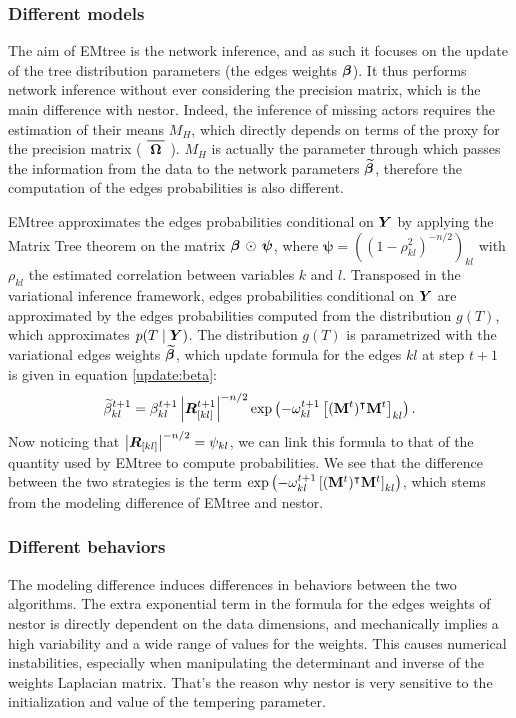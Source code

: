 \begin{subappendices}
\subsubsection*{Different models}

The aim of EMtree is the network inference, and as such it focuses on the update of the tree distribution parameters (the edges weights ${\boldsymbol{\beta}}$). It thus performs network inference without ever considering the precision matrix, which is the main difference with nestor.  Indeed, the inference of missing actors requires the estimation of their means $M_H$, which directly depends on terms of the proxy for the precision matrix ($\xbar{\Omegabf}$). $M_H$ is actually the parameter through which passes the information from the data to the network parameters ${\widetilde{{\boldsymbol{\beta}}}}$, therefore the computation of the edges probabilities is also different. 

EMtree approximates the edges probabilities conditional on  ${\boldsymbol{Y}}$ by applying the Matrix Tree theorem on the matrix ${\boldsymbol{\beta}} \,\odot \,\boldsymbol{\psi}$, where $\boldsymbol{\psi}=\left((1-\rho_{kl}^2)^{-n/2}\right)_{kl}$ with $\rho_{kl}$ the estimated correlation between variables $k$ and $l$. Transposed in the variational inference framework, edges probabilities conditional on ${\boldsymbol{Y}}$ are approximated by the edges probabilities computed from the distribution $g(T)$, which approximates $p(T\mid{\boldsymbol{Y}})$. The distribution $g(T)$ is parametrized with the  variational edges weights ${\widetilde{{\boldsymbol{\beta}}}}$, which update formula for the edges $kl$ at step $t+1$ is given in equation \eqref{update:beta}: $$ {\widetilde{\beta}}^{t+1}_{kl} = \beta^{t+1}_{kl} \left|{\boldsymbol{R}}_{[kl]}^{t+1}\right|^{-n/2} \exp\left(-\omega^{t+1}_{kl} \left[({\bf M}^t)^\intercal {\bf M}^t\right]_{kl}\right).$$
Now noticing that $ \left|{\boldsymbol{R}}_{[kl]}\right|^{-n/2} =\psi_{kl}$,  we can link this formula to that of the quantity used by EMtree to compute probabilities. We see that the difference between the two strategies is the term $\exp\left(-\omega^{t+1}_{kl} \left[({\bf M}^t)^\intercal {\bf M}^t\right]_{kl}\right)$, which stems from the modeling difference of EMtree and nestor.

\subsubsection*{Different behaviors}
The modeling difference induces differences in behaviors between the two algorithms. The extra exponential term in the formula for the edges weights of nestor is directly dependent on the data dimensions, and mechanically implies a high variability and a wide range of values for the weights. This causes numerical instabilities, especially when manipulating the determinant and inverse of the weights Laplacian matrix. That's the reason why nestor is very sensitive to the initialization and value of the tempering parameter.


\end{subappendices}
